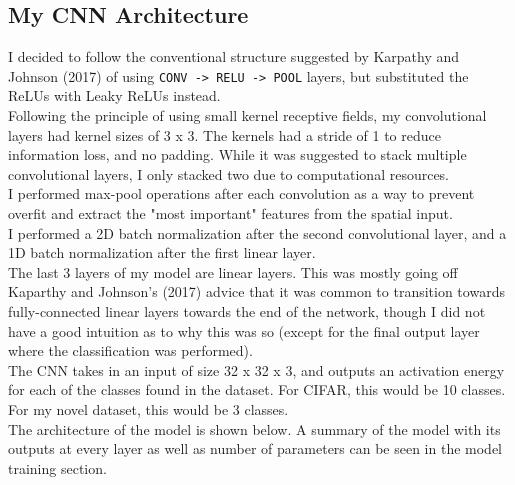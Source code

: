 \documentclass[11pt]{article}
\begin{document}
\subsection{My CNN Architecture}\label{my-cnn-architecture}

I decided to follow the conventional structure suggested by Karpathy and
Johnson (2017) of using
\texttt{CONV\ -\textgreater{}\ RELU\ -\textgreater{}\ POOL} layers, but
substituted the ReLUs with Leaky ReLUs instead.\\

Following the principle of using small kernel receptive fields, my
convolutional layers had kernel sizes of 3 x 3. The kernels had a stride
of 1 to reduce information loss, and no padding. While it was suggested
to stack multiple convolutional layers, I only stacked two due to
computational resources.\\

I performed max-pool operations after each convolution as a way to
prevent overfit and extract the "most important" features from the
spatial input.\\

I performed a 2D batch normalization after the second convolutional
layer, and a 1D batch normalization after the first linear layer.\\

The last 3 layers of my model are linear layers. This was mostly going
off Kaparthy and Johnson's (2017) advice that it was common to
transition towards fully-connected linear layers towards the end of the
network, though I did not have a good intuition as to why this was so
(except for the final output layer where the classification was
performed).\\

The CNN takes in an input of size 32 x 32 x 3, and outputs an activation
energy for each of the classes found in the dataset. For CIFAR, this
would be 10 classes. For my novel dataset, this would be 3 classes.\\

The architecture of the model is shown below. A summary of the model
with its outputs at every layer as well as number of parameters can be
seen in the model training section.\\
\end{document}
